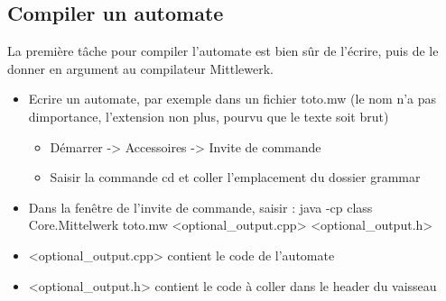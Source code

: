 \documentclass[a4paper,11pt]{article}
\begin{document}
    \subsection{Compiler un automate}
        La première tâche pour compiler l'automate est bien sûr de l'écrire, puis de le donner en argument au compilateur Mittlewerk.\newline

        \begin{itemize}
            \item Ecrire un automate, par exemple dans un fichier toto.mw (le nom n'a pas dimportance, l'extension non plus, pourvu que le texte soit brut)
            \begin{itemize}
                \item Démarrer -> Accessoires -> Invite de commande
                \item Saisir la commande cd et coller l'emplacement du dossier grammar \newline
            \end{itemize}
            
            \item Dans la fenêtre de l'invite de commande, saisir : java -cp class Core.Mittelwerk toto.mw <optional\_output.cpp> <optional\_output.h>
            \item <optional\_output.cpp> contient le code de l'automate
            \item <optional\_output.h> contient le code à coller dans le header du vaisseau	
        \end{itemize}
\end{document}
